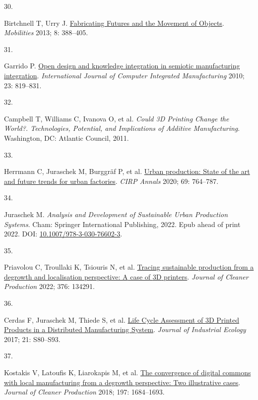 \documentclass[
  12pt,
  a4paperpaper,
  onecolumn]{article}
\newlength{\cslhangindent}
\newlength{\csllabelwidth}
\newlength{\cslentryspacingunit} %
\newenvironment{CSLReferences}[2] %
 {%
  \setlength{\parindent}{0pt}
  \ifodd #1
  \let\oldpar\par
  \def\par{\hangindent=\cslhangindent\oldpar}
  \fi
  \setlength{\parskip}{#2\cslentryspacingunit}
 }%
 {}
\newcommand{\CSLLeftMargin}[1]{\parbox[t]{\csllabelwidth}{#1}}
\newcommand{\CSLRightInline}[1]{\parbox[t]{\linewidth - \csllabelwidth}{#1}\break}
\begin{document}
\begin{CSLReferences}{0}{0}
\leavevmode{}%
\CSLLeftMargin{30. }%
\CSLRightInline{Birtchnell T, Urry J.
\href{https://doi.org/10.1080/17450101.2012.745697}{Fabricating
{Futures} and the {Movement} of {Objects}}. \emph{Mobilities} 2013; 8:
388--405.}

\leavevmode{}%
\CSLLeftMargin{31. }%
\CSLRightInline{Garrido P.
\href{https://doi.org/10.1080/0951192X.2010.490923}{Open design and
knowledge integration in semiotic manufacturing integration}.
\emph{International Journal of Computer Integrated Manufacturing} 2010;
23: 819--831.}

\leavevmode{}%
\CSLLeftMargin{32. }%
\CSLRightInline{Campbell T, Williams C, Ivanova O, et al. \emph{Could
{3D Printing Change} the {World}?. {Technologies}, {Potential}, and
{Implications} of {Additive Manufacturing}}. {Washington, DC}: {Atlantic
Council}, 2011.}

\leavevmode{}%
\CSLLeftMargin{33. }%
\CSLRightInline{Herrmann C, Juraschek M, Burggräf P, et al.
\href{https://doi.org/10.1016/j.cirp.2020.05.003}{Urban production:
{State} of the art and future trends for urban factories}. \emph{CIRP
Annals} 2020; 69: 764--787.}

\leavevmode{}%
\CSLLeftMargin{34. }%
\CSLRightInline{Juraschek M. \emph{Analysis and {Development} of
{Sustainable Urban Production Systems}}. {Cham}: {Springer International
Publishing}, 2022. Epub ahead of print 2022. DOI:
\href{https://doi.org/10.1007/978-3-030-76602-3}{10.1007/978-3-030-76602-3}.}

\leavevmode{}%
\CSLLeftMargin{35. }%
\CSLRightInline{Priavolou C, Troullaki K, Tsiouris N, et al.
\href{https://doi.org/10.1016/j.jclepro.2022.134291}{Tracing sustainable
production from a degrowth and localisation perspective: {A} case of
{3D} printers}. \emph{Journal of Cleaner Production} 2022; 376: 134291.}

\leavevmode{}%
\CSLLeftMargin{36. }%
\CSLRightInline{Cerdas F, Juraschek M, Thiede S, et al.
\href{https://doi.org/10.1111/jiec.12618}{Life {Cycle Assessment} of {3D
Printed Products} in a {Distributed Manufacturing System}}.
\emph{Journal of Industrial Ecology} 2017; 21: S80--S93.}

\leavevmode{}%
\CSLLeftMargin{37. }%
\CSLRightInline{Kostakis V, Latoufis K, Liarokapis M, et al.
\href{https://doi.org/10.1016/j.jclepro.2016.09.077}{The convergence of
digital commons with local manufacturing from a degrowth perspective:
{Two} illustrative cases}. \emph{Journal of Cleaner Production} 2018;
197: 1684--1693.}


\end{CSLReferences}
\end{document}
